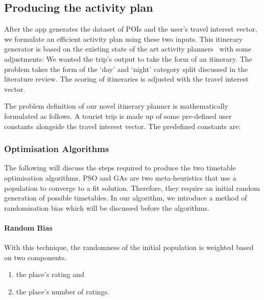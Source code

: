 
\subsection{Producing the activity plan}

After the app generates the dataset of POIs and the
user's travel interest vector, we formulate an
efficient activity plan using these two inputs. This
itinerary generator is based on the existing state of
the art activity planners~\cite{Sylejmani2017, Wisittipanich2020}
with some adjustments: We wanted the trip's output to take the
form of an itinerary.  The problem takes the form of
the `day' and `night'  category split discussed in
the literature review.  The scoring of itineraries is adjusted
with the travel interest vector.

The problem definition of our novel itinerary planner
is mathematically formulated as follows. A tourist trip is made up
of some pre-defined user constants alongside the travel interest
vector. The predefined constants are:
\\




\subsubsection{Optimisation Algorithms}

The following will discuss the steps required to
produce the two timetable optimisation algorithms. PSO
and GAs are two meta-heuristics that use a population
to converge to a fit solution. Therefore, they require
an initial random generation of possible timetables. In
our algorithm, we introduce a method of randomisation
bias which will be discussed before the algorithms.


\paragraph{Random Bias}
With this technique, the randomness of the initial
population is weighted based on two components.
\begin{enumerate}

    \item  the place's rating and 

    \item the place's number of ratings.
\end{enumerate}


